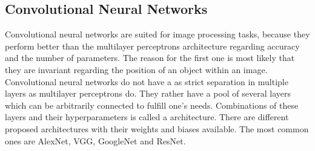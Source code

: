 \subsection{Convolutional Neural Networks}
\label{sec:neural-networks-convolutional-neural-networks}
Convolutional neural networks are suited for image processing tasks, because they perform better than the multilayer perceptrons architecture regarding accuracy and the number of parameters\cite{Lecun98}\cite{LeCun1998cnn}.
The reason for the first one is most likely that they are invariant regarding the position of an object within an image.
Convolutional neural networks do not have a as strict separation in multiple layers as multilayer perceptrons do.
They rather have a pool of several layers which can be arbitrarily connected to fulfill one's needs.
Combinations of these layers and their hyperparameters is called a architecture.
There are different proposed architectures with their weights and biases available.
The most common ones are AlexNet, VGG, GoogleNet and ResNet.



